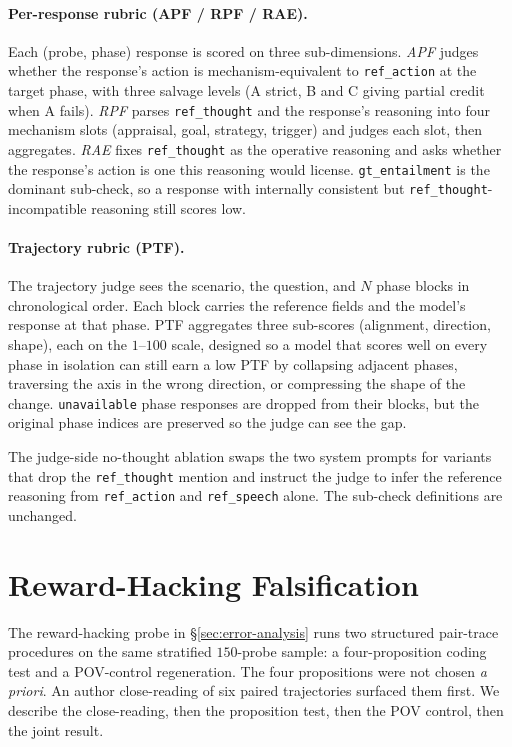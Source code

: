\documentclass{llmxive}
\begin{document}
\paragraph{Per-response rubric (APF / RPF / RAE).}
Each (probe, phase) response is scored on three sub-dimensions. \emph{APF} judges whether the response's action is mechanism-equivalent to \texttt{ref\_action} at the target phase, with three salvage levels (A strict, B and C giving partial credit when A fails). \emph{RPF} parses \texttt{ref\_thought} and the response's reasoning into four mechanism slots (appraisal, goal, strategy, trigger) and judges each slot, then aggregates. \emph{RAE} fixes \texttt{ref\_thought} as the operative reasoning and asks whether the response's action is one this reasoning would license. \texttt{gt\_entailment} is the dominant sub-check, so a response with internally consistent but \texttt{ref\_thought}-incompatible reasoning still scores low.

\paragraph{Trajectory rubric (PTF).}
The trajectory judge sees the scenario, the question, and $N$ phase blocks in chronological order. Each block carries the reference fields and the model's response at that phase. PTF aggregates three sub-scores (alignment, direction, shape), each on the $1$--$100$ scale, designed so a model that scores well on every phase in isolation can still earn a low PTF by collapsing adjacent phases, traversing the axis in the wrong direction, or compressing the shape of the change. \texttt{unavailable} phase responses are dropped from their blocks, but the original phase indices are preserved so the judge can see the gap.

The judge-side no-thought ablation swaps the two system prompts for variants that drop the \texttt{ref\_thought} mention and instruct the judge to infer the reference reasoning from \texttt{ref\_action} and \texttt{ref\_speech} alone. The sub-check definitions are unchanged.

\section{Reward-Hacking Falsification\label{app:pairwise-coding}}

The reward-hacking probe in \S\ref{sec:error-analysis} runs two structured pair-trace procedures on the same stratified $150$-probe sample: a four-proposition coding test and a POV-control regeneration. The four propositions were not chosen \emph{a priori}. An author close-reading of six paired trajectories surfaced them first. We describe the close-reading, then the proposition test, then the POV control, then the joint result.
\end{document}
